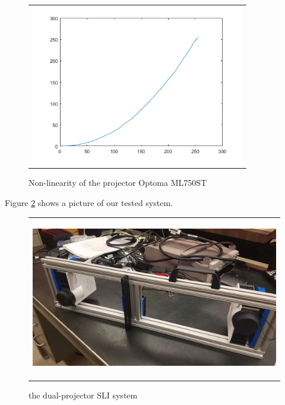 \documentclass[]{spie}  %
\begin{document}
\begin{figure}
   \begin{center}
   \begin{tabular}{c}
   \includegraphics[height=7cm]{wolut.png}
   \end{tabular}
   \end{center}
   \caption{Non-linearity of the projector Optoma ML750ST}
   \label{Fig:2}
   \end{figure} 


Figure \ref{Fig:3} shows a picture of our tested system.

\begin{figure}
   \begin{center}
   \begin{tabular}{c}
   \includegraphics[height=7cm]{dpphoto.jpg}
   \end{tabular}
   \end{center}
   \caption{the dual-projector SLI system}
   \label{Fig:3}
   \end{figure} 



\end{document}

